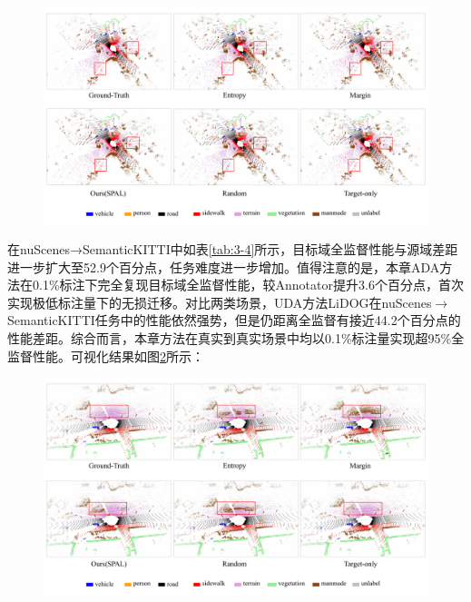 \vspace{-0.1cm}
\begin{figure}[h]
    \centering
    \includegraphics[width = \textwidth]{ljx/figure/3_vision_k2n.pdf}
    \label{fig:3-v-3}
\end{figure}
\vspace{-0.35cm}
在nuScenes→SemanticKITTI中如表\ref{tab:3-4}所示，目标域全监督性能与源域差距进一步扩大至52.9个百分点，任务难度进一步增加。值得注意的是，本章ADA方法在0.1\%标注下完全复现目标域全监督性能，较Annotator提升3.6个百分点，首次实现极低标注量下的无损迁移。对比两类场景，UDA方法LiDOG在nuScenes\(\to\)SemanticKITTI任务中的性能依然强势，但是仍距离全监督有接近44.2个百分点的性能差距。综合而言，本章方法在真实到真实场景中均以0.1\%标注量实现超95\%全监督性能。可视化结果如图\ref{fig:3-v-4}所示：
\vspace{0.1cm}


\vspace{-0.1cm}
\begin{figure}[H]
    \centering
    \includegraphics[width = \textwidth]{ljx/figure/3_vision_n2k.pdf}
    \label{fig:3-v-4}
\end{figure}
\vspace{-0.35cm}
